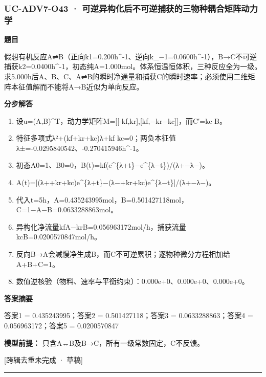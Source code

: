 \documentclass[UTF8,11pt,a4paper]{ctexart}
\begin{document}
\subsubsection*{UC-ADV7-O43 · 可逆异构化后不可逆捕获的三物种耦合矩阵动力学}
\noindent\textbf{题目}\par
假想有机反应A⇌B（正向k1=0.200h\textasciicircum{}-1、逆向k\_−1=0.0600h\textasciicircum{}-1），B→C不可逆捕获k2=0.0400h\textasciicircum{}-1，初态纯A=1.000mol。体系恒温恒体积，三种反应全为一级。求5.000h后A、B、C、A⇌B的瞬时净通量和捕获C的瞬时速率；必须使用二维矩阵本征值解而不能将A→B近似为单向反应。\par
\medskip\noindent\textbf{分步解答}
\begin{enumerate}
\item 设u=(A,B)\textasciicircum{}T，动力学矩阵M=[[-kf,kr],[kf,−kr−kc]]，而C′=kc B。
\item 特征多项式λ²+(kf+kr+kc)λ+kf kc=0；两负本征值λ±=-0.0295840542、-0.270415946h\textasciicircum{}-1。
\item 初态A0=1、B0=0，B(t)=kf(e\textasciicircum{}\{λ+t\}−e\textasciicircum{}\{λ−t\})/(λ+−λ−)。
\item A(t)=[(λ++kr+kc)e\textasciicircum{}\{λ+t\}−(λ−+kr+kc)e\textasciicircum{}\{λ−t\}]/(λ+−λ−)。
\item 代入t=5h，A=0.435243995mol，B=0.501427118mol，C=1−A−B=0.0633288863mol。
\item 异构化净流量kfA−krB=0.056963172mol/h，捕获流量kcB=0.0200570847mol/h。
\item 反向B→A会减慢净生成B，而C不可逆累积；逐物种微分方程相加给A+B+C=1。
\item 数值逆核验（物料、速率与平衡约束）：0.000e+0、0.000e+0、0.000e+0。
\end{enumerate}
\noindent\textbf{答案摘要}\par
答案1 = 0.435243995；答案2 = 0.501427118；答案3 = 0.0633288863；答案4 = 0.056963172；答案5 = 0.0200570847\par
\noindent\textbf{模型前提：}
只含A↔B及B→C，所有一级常数固定，C不反馈。\par
\noindent\textcolor{red!65!black}{[跨辑去重未完成 · 草稿]} \par
\medskip\hrule\medskip
{}
\end{document}
